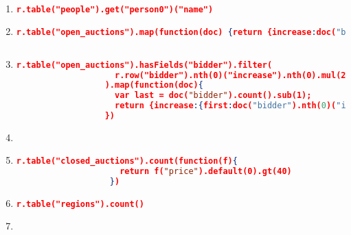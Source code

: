 \label{xmark-queries-rethindb}
\begin{enumerate}[label=Q\arabic*.]
	\item \label{rethink-q-1}%
	
	\begin{lstlisting}[language=JSON, basicstyle=\scriptsize]
		r.table("people").get("person0")("name")
	\end{lstlisting}

	\item \label{rethink-q-2}%
	\begin{lstlisting}[language=JSON, basicstyle=\scriptsize]
	r.table("open_auctions").map(function(doc) {return {increase:doc("bidder").nth(0)("increase").nth(0).default("")}})
	
	\end{lstlisting}
	
    \item \label{rethink-q-3}%
	\begin{lstlisting}[language=JSON, basicstyle=\scriptsize]
	  r.table("open_auctions").hasFields("bidder").filter(
	                r.row("bidder").nth(0)("increase").nth(0).mul(2).le(r.row("bidder").nth(r.row("bidder").count().sub(1))("increase").nth(0))
	              ).map(function(doc){
	                var last = doc("bidder").count().sub(1);
	                return {increase:{first:doc("bidder").nth(0)("increase").nth(0), last:doc("bidder").nth(last)("increase").nth(0)} }
	              })
	\end{lstlisting}
	
	
    \item \label{rethink-q-4}%
	\par
	
	
    \item \label{rethink-q-5}%
	\begin{lstlisting}[language=JSON, basicstyle=\scriptsize]
	   r.table("closed_auctions").count(function(f){
	                 return f("price").default(0).gt(40)
	               })
	\end{lstlisting}
	
    \item \label{rethink-q-6}%
	\begin{lstlisting}[language=JSON, basicstyle=\scriptsize]
	   r.table("regions").count()
	\end{lstlisting}
	
	
    \item \label{rethink-q-7}%
    \par
	

\end{enumerate}
